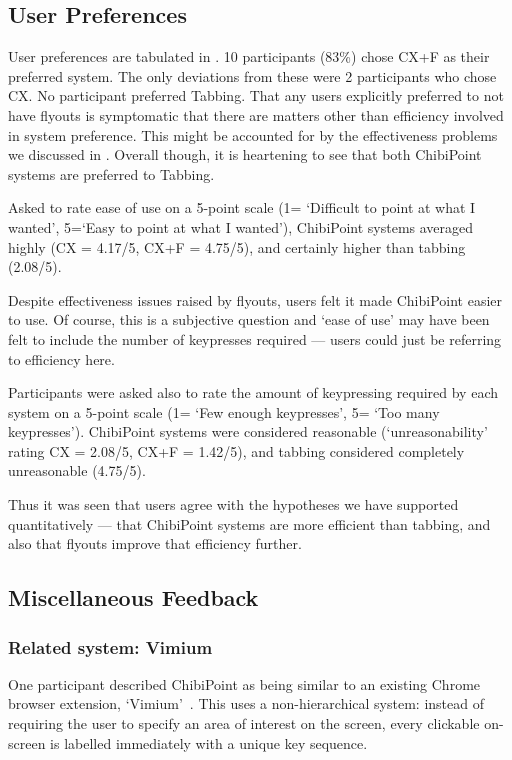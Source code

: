 \documentclass[a4paper, 12pt]{report}
\begin{document}
\subsection{User Preferences}
User preferences are tabulated in . 10 participants (83\%) chose CX+F as their preferred system. The only deviations from these were 2 participants who chose CX. No participant preferred Tabbing. That any users explicitly preferred to not have flyouts is symptomatic that there are matters other than efficiency involved in system preference. This might be accounted for by the effectiveness problems we discussed in . Overall though, it is heartening to see that both ChibiPoint systems are preferred to Tabbing.

Asked to rate ease of use on a 5-point scale (1= `Difficult to point at what I wanted', 5=`Easy to point at what I wanted'), ChibiPoint systems averaged highly (CX = 4.17/5, CX+F = 4.75/5), and certainly higher than tabbing (2.08/5).

Despite effectiveness issues raised by flyouts, users felt it made ChibiPoint easier to use. Of course, this is a subjective question and `ease of use' may have been felt to include the number of keypresses required --- users could just be referring to efficiency here.

Participants were asked also to rate the amount of keypressing required by each system on a 5-point scale (1= `Few enough keypresses', 5= `Too many keypresses'). ChibiPoint systems were considered reasonable (`unreasonability' rating CX = 2.08/5, CX+F = 1.42/5), and tabbing considered completely unreasonable (4.75/5).

Thus it was seen that users agree with the hypotheses we have supported quantitatively --- that ChibiPoint systems are more efficient than tabbing, and also that flyouts improve that efficiency further.

\subsection{Miscellaneous Feedback}
\subsubsection{Related system: Vimium}
One participant described ChibiPoint as being similar to an existing Chrome browser extension, `Vimium'~\cite{vimium}. This uses a non-hierarchical system: instead of requiring the user to specify an area of interest on the screen, every clickable on-screen is labelled immediately with a unique key sequence.
\end{document}
